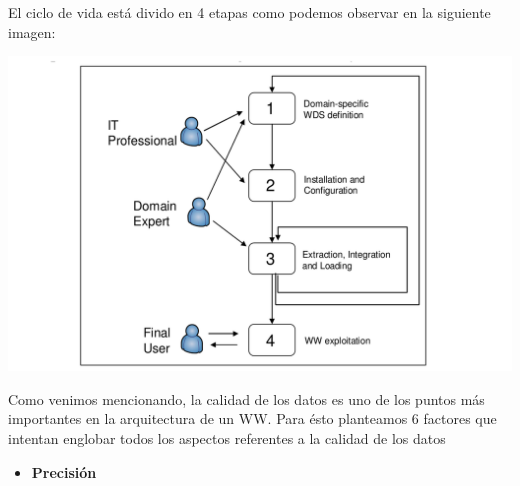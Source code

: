 \documentclass{fancyslides}
\begin{document}
\begin{frame}
\end{frame}

\begin{frame}
\misc
{ 
  El ciclo de vida está divido en 4 etapas como podemos observar en la siguiente imagen:
}
\end{frame}

\begin{frame}
\misc
{

\begin{center}
  \includegraphics[scale=0.15]{lifecycle}
\end{center}

}
\end{frame}


\begin{frame}
\end{frame}

\begin{frame}
\misc
{ 
  Como venimos mencionando, la calidad de los datos es uno de los puntos más importantes en la arquitectura de un WW. Para ésto planteamos 6 factores que intentan englobar todos los aspectos referentes a la calidad de los datos
}
\end{frame}

\begin{frame}
\misc
{
\begin{itemize}
  \item \textbf{Precisión}
\end{itemize}

}
\end{frame}
\end{document}
